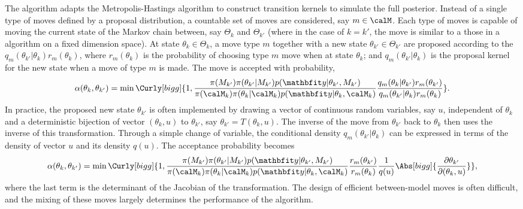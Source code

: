 The \rjmcmc algorithm adapts the Metropolis-Hastings algorithm to construct
transition kernels to simulate the full posterior. Instead of a single type of
moves defined by a proposal distribution, a countable set of moves are
considered, say $m\in\calM$. Each type of moves is capable of moving the
current state of the Markov chain between, say $\Theta_k$ and $\Theta_{k'}$
(where in the case of $k = k'$, the move is similar to a those in a \mcmc
algorithm on a fixed dimension space). At state $\theta_k\in\Theta_k$, a move
type $m$ together with a new state $\theta_{k'}\in\Theta_{k'}$ are proposed
according to the $q_m(\theta_{k'}|\theta_k)r_m(\theta_k)$, where
$r_m(\theta_k)$ is the probability of choosing type $m$ move when at state
$\theta_k$; and $q_m(\theta_{k'}|\theta_k)$ is the proposal kernel for the new
state when a move of type $m$ is made. The move is accepted with probability,
\begin{equation}
  \alpha(\theta_k,\theta_{k'}) =
  \min\Curly[bigg]{1,
    \frac{\pi(M_{k'})\pi(\theta_{k'}|M_{k'})p(\data|\theta_{k'},M_{k'})}
    {\pi(\calM_k)\pi(\theta_k|\calM_k)p(\data|\theta_k,\calM_k)}
    \frac{q_m(\theta_k|\theta_{k'})r_m(\theta_{k'})}
    {q_m(\theta_{k'}|\theta_k)r_m(\theta_k)}
  }.
\end{equation}
In practice, the proposed new state $\theta_{k'}$ is often implemented by
drawing a vector of continuous random variables, say $u$, independent of
$\theta_k$ and a deterministic bijection of vector $(\theta_k,u)$ to
$\theta_{k'}$, say $\theta_{k'} = T(\theta_k,u)$. The inverse of the move from
$\theta_{k'}$ back to $\theta_k$ then uses the inverse of this transformation.
Through a simple change of variable, the conditional density
$q_m(\theta_{k'}|\theta_k)$ can be expressed in terms of the density of vector
$u$ and its density $q(u)$. The acceptance probability becomes
\begin{equation}
  \alpha(\theta_k,\theta_{k'}) =
  \min\Curly[bigg]{1,
    \frac{\pi(M_{k'})\pi(\theta_{k'}|M_{k'})p(\data|\theta_{k'},M_{k'})}
    {\pi(\calM_k)\pi(\theta_k|\calM_k)p(\data|\theta_k,\calM_k)}
    \frac{r_m(\theta_{k'})}{r_m(\theta_k)}
    \frac{1}{q(u)}\Abs[bigg]{\frac{\partial\theta_{k'}}{\partial(\theta_k,u)}}
  },
\end{equation}
where the last term is the determinant of the Jacobian of the transformation.
The design of efficient between-model moves is often difficult, and the mixing
of these moves largely determines the performance of the algorithm.


